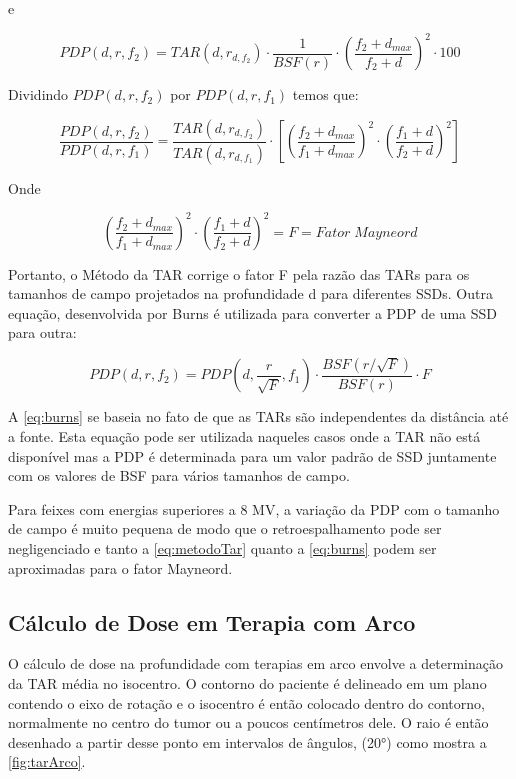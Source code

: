 \documentclass[11pt,a4paper]{article}
\begin{document}
	e 

		$$PDP(d, r, f_2) = TAR(d, r_{d, f_2}) \cdot \frac{1}{BSF(r)} \cdot \left(\frac{f_2 + d_{max}}{f_2 + d}\right)^2 \cdot 100$$


	Dividindo $PDP(d, r, f_2)$ por $PDP(d, r, f_1)$ temos que:

	\begin{equation}
		\frac{PDP(d, r, f_2)}{PDP(d, r, f_1)} = \frac{TAR(d, r_{d, f_2})}{TAR(d, r_{d, f_1})} \cdot \left[\left(\frac{f_2 + d_{max}}{f_1 + d_{max}}\right)^2 \cdot \left(\frac{f_1 + d}{f_2 + d}\right)^2\right]
		\label{eq:metodoTar}
	\end{equation}

	Onde 

	$$\left(\frac{f_2 + d_{max}}{f_1 + d_{max}}\right)^2 \cdot \left(\frac{f_1 + d}{f_2 + d}\right)^2 = F = Fator \; Mayneord$$

	Portanto, o Método da TAR corrige o fator F pela razão das TARs para os tamanhos de campo projetados na profundidade d para diferentes SSDs. Outra equação, desenvolvida por Burns é utilizada para converter a PDP de uma SSD para outra:

	\begin{equation}
		PDP(d, r, f_2) = PDP(d, \frac{r}{\sqrt{F}}, f_1) \cdot \frac{BSF(r/\sqrt{F})}{BSF(r)} \cdot F
		\label{eq:burns}
	\end{equation}

	A \ref{eq:burns} se baseia no fato de que as TARs são independentes da distância até a fonte. Esta equação pode ser utilizada naqueles casos onde a TAR não está disponível mas a PDP é determinada para um valor padrão de SSD juntamente com os valores de BSF para vários tamanhos de campo. 

	Para feixes com energias superiores a 8 MV, a variação da PDP com o tamanho de campo é muito pequena de modo que o retroespalhamento pode ser negligenciado e tanto a  \ref{eq:metodoTar} quanto a \ref{eq:burns} podem ser aproximadas para o fator Mayneord.

	\subsection{Cálculo de Dose em Terapia com Arco}

	O cálculo de dose na profundidade com terapias em arco envolve a determinação da TAR média no isocentro. O contorno do paciente é delineado em um plano contendo o eixo de rotação e o isocentro é então colocado dentro do contorno, normalmente no centro do tumor ou a poucos centímetros dele. O raio é então desenhado a partir desse ponto em intervalos de ângulos, (\ang{20}) como mostra a \ref{fig:tarArco}. 
\end{document}
